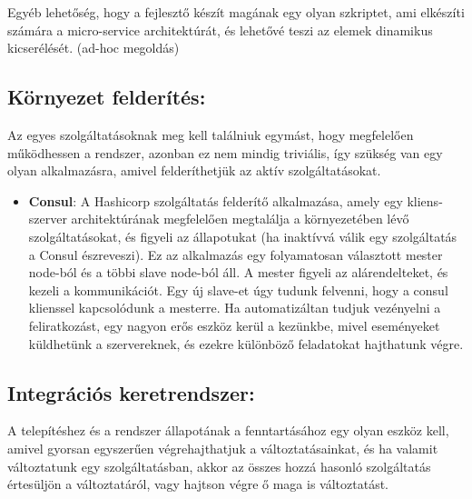 \documentclass[11pt,magyar,a4paper,oneside,]{report}
\begin{document}
Egyéb lehetőség, hogy a fejlesztő készít magának egy olyan szkriptet,
ami elkészíti számára a micro-service architektúrát, és lehetővé teszi
az elemek dinamikus kicserélését. (ad-hoc megoldás)

\subsection{Környezet felderítés:}\label{kuxf6rnyezet-felderuxedtuxe9s}

Az egyes szolgáltatásoknak meg kell találniuk egymást, hogy megfelelően
működhessen a rendszer, azonban ez nem mindig triviális, így szükség van
egy olyan alkalmazásra, amivel felderíthetjük az aktív szolgáltatásokat.

\begin{itemize}
\itemsep1pt\parskip0pt
\item
  \textbf{Consul}: A Hashicorp szolgáltatás felderítő alkalmazása, amely
  egy kliens-szerver architektúrának megfelelően megtalálja a
  környezetében lévő szolgáltatásokat, és figyeli az állapotukat (ha
  inaktívvá válik egy szolgáltatás a Consul észreveszi). Ez az
  alkalmazás egy folyamatosan választott mester node-ból és a többi
  slave node-ból áll. A mester figyeli az alárendelteket, és kezeli a
  kommunikációt. Egy új slave-et úgy tudunk felvenni, hogy a consul
  klienssel kapcsolódunk a mesterre. Ha automatizáltan tudjuk vezényelni
  a feliratkozást, egy nagyon erős eszköz kerül a kezünkbe, mivel
  eseményeket küldhetünk a szervereknek, és ezekre különböző feladatokat
  hajthatunk végre.
\end{itemize}

\subsection{Integrációs
keretrendszer:}\label{integruxe1ciuxf3s-keretrendszer}

A telepítéshez és a rendszer állapotának a fenntartásához egy olyan
eszköz kell, amivel gyorsan egyszerűen végrehajthatjuk a
változtatásainkat, és ha valamit változtatunk egy szolgáltatásban, akkor
az összes hozzá hasonló szolgáltatás értesüljön a változtatáról, vagy
hajtson végre ő maga is változtatást.
\end{document}
